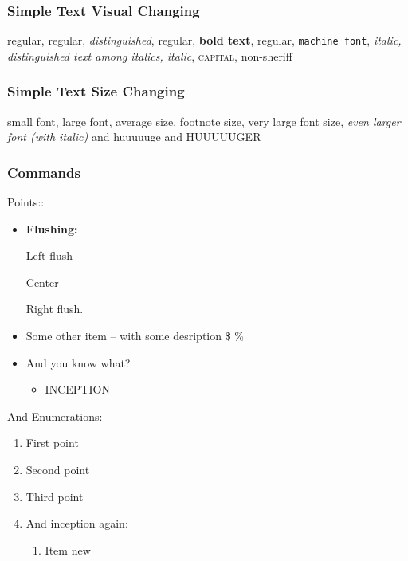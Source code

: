 \subsubsection{Simple Text Visual Changing} %

regular, regular, \emph{distinguished}, regular, \textbf{bold text}, regular, 
\texttt{machine font}, \textit{ italic, {\em distinguished text among italics}, italic},
 \textsc{capital}, \textsf{non-sheriff}


\subsubsection{Simple Text Size Changing}

{\small small font}, {\large large font}, average size, {\footnotesize footnote size}, {\Large very large font size},
\textit{\LARGE even larger font (with italic)} {\huge and huuuuuge} {\Huge and HUUUUUGER}

\subsubsection{Commands}


Points:: %
\begin{itemize}
    \item \textbf{Flushing:}
        \begin{flushleft}
        Left flush
        \end{flushleft}
        \begin{center}
        Center
        \end{center}
        \begin{flushright}
        Right flush.
        \end{flushright}
    \item Some other item -- with some desription \$ \%
    \item And you know what?
        \begin{itemize} %
        \item INCEPTION
        \end{itemize}
\end{itemize}

And Enumerations: %
\begin{enumerate}
    \item First point
    \item Second point
    \item Third point
    \item And inception again:
    \begin{enumerate}
        \item Item new
    \end{enumerate}
\end{enumerate}